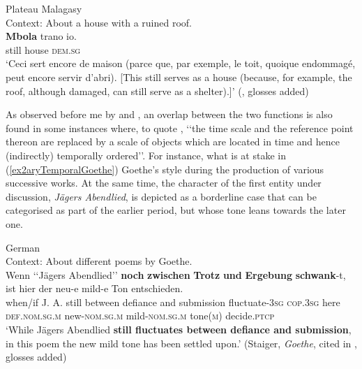 \begin{exe}
	\ex\label{exMarginalMalagasy}Plateau Malagasy\\
	Context: About a house with a ruined roof.\\
	\gll \textbf{Mbola} trano io.\\
	still house \textsc{dem}.\textsc{sg}\\
	\glt \lq Ceci sert encore de maison (parce que, par exemple, le toit, quoique endommagé, peut encore servir d'abri). [This still serves as a house (because, for example, the roof, although damaged, can still serve as a shelter).]' (\cite[128]{Dez1980}, glosses added)
\end{exe}

As observed before me by \textcite{Rombouts1979} and \textcite[77]{VictorriFuchs1996}, an overlap between the two functions is also found in some instances where, to quote \textcite[203]{Loebner1989}, \lq\lq the time scale and the reference point thereon are replaced by a scale of objects which are located in time and hence (indirectly) temporally ordered\rq\rq{}. For instance, what is at stake in (\ref{ex2aryTemporalGoethe}) Goethe's style during the production of various successive works. At the same time, the character of the first entity under discussion, \textit{Jägers Abendlied}, is depicted as a borderline case that can be categorised as part of the earlier period, but whose tone leans towards the later one.

\begin{exe}
	\ex German\label{ex2aryTemporalGoethe}\\
	 Context: About different poems by Goethe.\\
	\gll Wenn \lq\lq Jägers Abendlied\rq\rq{} \textbf{noch} \textbf{zwischen} \textbf{Trotz} \textbf{und} \textbf{Ergebung} \textbf{schwank}-t, ist hier der neu-e mild-e Ton entschieden.\\
	when/if \phantom{\lq\lq}J. A. still between defiance and submission fluctuate-3\textsc{sg} \textsc{cop}.3\textsc{sg} here \textsc{def}.\textsc{nom}.\textsc{sg}.\textsc{m} new-\textsc{nom}.\textsc{sg}.\textsc{m} mild-\textsc{nom}.\textsc{sg}.\textsc{m} tone(\textsc{m}) decide.\textsc{ptcp}\\
	\glt \lq While Jägers Abendlied \textbf{still fluctuates between defiance and submission}, in this poem the new mild tone has been settled upon.\rq{ }(Staiger, \textit{Goethe}, cited in \cite[52]{Shetter1966}, glosses added)
\end{exe}

